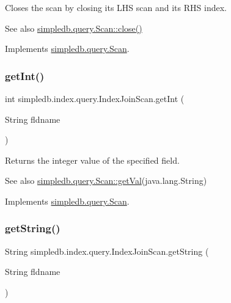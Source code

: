 Closes the scan by closing its L\+HS scan and its R\+HS index. \begin{DoxySeeAlso}{See also}
\hyperlink{interfacesimpledb_1_1query_1_1Scan_a260f40a8c82edaa00398bea9d698933c}{simpledb.\+query.\+Scan\+::close()} 
\end{DoxySeeAlso}


Implements \hyperlink{interfacesimpledb_1_1query_1_1Scan_a260f40a8c82edaa00398bea9d698933c}{simpledb.\+query.\+Scan}.

\mbox{\label{classsimpledb_1_1index_1_1query_1_1IndexJoinScan_aa18e11532e9379d49fac3b9b3cd6f0a6}} 
\subsubsection{\texorpdfstring{get\+Int()}{getInt()}}
{\footnotesize\ttfamily int simpledb.\+index.\+query.\+Index\+Join\+Scan.\+get\+Int (\begin{DoxyParamCaption}\item[{String}]{fldname }\end{DoxyParamCaption})\hspace{0.3cm}{\ttfamily [inline]}}

Returns the integer value of the specified field. \begin{DoxySeeAlso}{See also}
\hyperlink{interfacesimpledb_1_1query_1_1Scan_aca80bca2857c983a88834bf6c01ee5ca}{simpledb.\+query.\+Scan\+::get\+Val}(java.\+lang.\+String) 
\end{DoxySeeAlso}


Implements \hyperlink{interfacesimpledb_1_1query_1_1Scan_a2e064555e16240115167b5d42d2b3d19}{simpledb.\+query.\+Scan}.

\mbox{\label{classsimpledb_1_1index_1_1query_1_1IndexJoinScan_adf3610c0e68bc8491ec7d6d887b71a59}} 
\subsubsection{\texorpdfstring{get\+String()}{getString()}}
{\footnotesize\ttfamily String simpledb.\+index.\+query.\+Index\+Join\+Scan.\+get\+String (\begin{DoxyParamCaption}\item[{String}]{fldname }\end{DoxyParamCaption})\hspace{0.3cm}{\ttfamily [inline]}}

